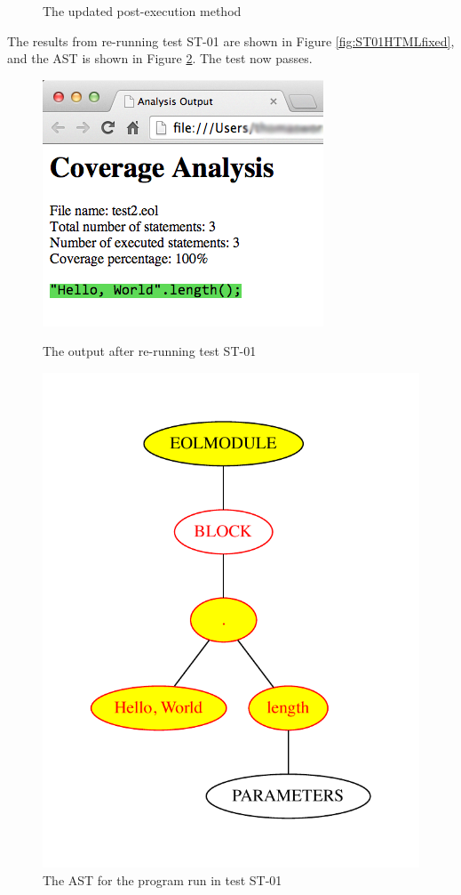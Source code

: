 \begin{figure}[h]
	
	\caption{The updated post-execution method}
	\label{lst:StatementCoverageST01Mod}
\end{figure}

The results from re-running test ST-01 are shown in Figure \ref{fig:ST01HTMLfixed}, and the AST is shown in Figure \ref{fig:ST01ASTfixed}. The test now passes.

\begin{figure}
\centering
\begin{minipage}{.5\textwidth}
  \centering
  \includegraphics[width=0.6\linewidth]{figures/ST01HTML_fixed.png}
  \caption{The output after re-running test ST-01}
  \label{fig:ST01HTMLfixed}
\end{minipage}%
\begin{minipage}{.5\textwidth}
  \centering
  \includegraphics[width=0.6\linewidth]{figures/ST01AST_fixed.pdf}
  \caption{The AST for the program run in test ST-01}
  \label{fig:ST01ASTfixed}
\end{minipage}
\end{figure}

